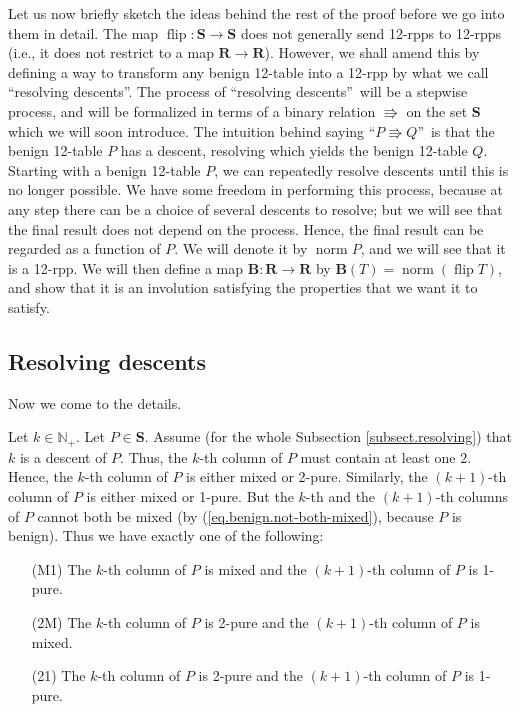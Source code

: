 \documentclass[numbers=enddot,12pt,final,onecolumn,notitlepage]{scrartcl}%
\theoremstyle{definition}
\begin{document}
Let us now briefly sketch the ideas behind the rest of the proof before we go
into them in detail. The map $\operatorname*{flip}:\mathbf{S}\rightarrow
\mathbf{S}$ does not generally send 12-rpps to 12-rpps (i.e., it does not
restrict to a map $\mathbf{R}\rightarrow\mathbf{R}$). However, we shall amend
this by defining a way to transform any benign 12-table into a 12-rpp by what
we call \textquotedblleft resolving descents\textquotedblright. The process of
\textquotedblleft resolving descents\textquotedblright\ will be a stepwise
process, and will be formalized in terms of a binary relation $\Rrightarrow$
on the set $\mathbf{S}$ which we will soon introduce. The intuition behind
saying \textquotedblleft$P\Rrightarrow Q$\textquotedblright\ is that the
benign 12-table $P$ has a descent, resolving which yields the benign 12-table
$Q$. Starting with a benign 12-table $P$, we can repeatedly resolve descents
until this is no longer possible. We have some freedom in
performing this process, because at any step there can be a choice of several
descents to resolve; but we will see that the final result does not depend on
the process. Hence, the final result can be regarded as a function of $P$. We
will denote it by $\operatorname*{norm}P$, and we will see that it is a
12-rpp. We will then define a map $\mathbf{B}:\mathbf{R}\rightarrow\mathbf{R}$
by $\mathbf{B}\left(  T\right)  =\operatorname*{norm}\left(
\operatorname*{flip}T\right)  $, and show that it is an involution satisfying
the properties that we want it to satisfy.

\subsection{\label{subsect.resolving}Resolving descents}

Now we come to the details.

Let $k\in\mathbb{N}_{+}$. Let $P\in\mathbf{S}$. Assume (for the whole Subsection \ref{subsect.resolving}) that $k$
is a descent of $P$. Thus, the $k$-th column of $P$ must contain at least one
$2$. Hence, the $k$-th column of $P$ is either mixed or 2-pure. Similarly, the
$\left(  k+1\right)  $-th column of $P$ is either mixed or 1-pure. But the
$k$-th and the $\left(  k+1\right)  $-th columns of $P$ cannot both be mixed
(by (\ref{eq.benign.not-both-mixed}), because $P$ is benign). Thus we
have exactly one of the following:

\begin{itemize}
\item[(M1)] The $k$-th column of $P$ is mixed and the $\left(  k+1\right)  $-th column of $P$ is 1-pure.

\item[(2M)] The $k$-th column of $P$ is 2-pure and the $\left(  k+1\right)  $-th column of $P$ is mixed.

\item[(21)] The $k$-th column of $P$ is 2-pure and the $\left(  k+1\right)  $-th column of $P$ is 1-pure.
\end{itemize}
\end{document}
